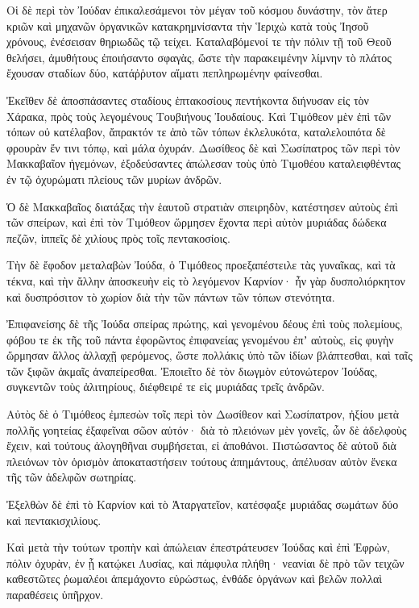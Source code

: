 {Οἱ δὲ περὶ τὸν Ἰούδαν ἐπικαλεσάμενοι τὸν μέγαν τοῦ κόσμου δυνάστην, τὸν ἄτερ κριῶν καὶ μηχανῶν ὀργανικῶν κατακρημνίσαντα τὴν Ἱεριχὼ κατὰ τοὺς Ἰησοῦ χρόνους, ἐνέσεισαν θηριωδῶς τῷ τείχει.
Καταλαβόμενοί τε τὴν πόλιν τῇ τοῦ Θεοῦ θελήσει, ἀμυθήτους ἐποιήσαντο σφαγὰς, ὥστε τὴν παρακειμένην λίμνην τὸ πλάτος ἔχουσαν σταδίων δύο, κατάῤῥυτον αἵματι πεπληρωμένην φαίνεσθαι.
\par }{\PP {}Ἐκεῖθεν δὲ ἀποσπάσαντες σταδίους ἑπτακοσίους πεντήκοντα διήνυσαν εἰς τὸν Χάρακα, πρὸς τοὺς λεγομένους Τουβιήνους Ἰουδαίους.
Καὶ Τιμόθεον μὲν ἐπὶ τῶν τόπων οὐ κατέλαβον, ἄπρακτόν τε ἀπὸ τῶν τόπων ἐκλελυκότα, καταλελοιπότα δὲ φρουρὰν ἔν τινι τόπῳ, καὶ μάλα ὀχυράν.
Δωσίθεος δὲ καὶ Σωσίπατρος τῶν περὶ τὸν Μακκαβαῖον ἡγεμόνων, ἐξοδεύσαντες ἀπώλεσαν τοὺς ὑπὸ Τιμοθέου καταλειφθέντας ἐν τῷ ὀχυρώματι πλείους τῶν μυρίων ἀνδρῶν.
\par }{\PP {}Ὁ δὲ Μακκαβαῖος διατάξας τὴν ἑαυτοῦ στρατιὰν σπειρηδὸν, κατέστησεν αὐτοὺς ἐπὶ τῶν σπείρων, καὶ ἐπὶ τὸν Τιμόθεον ὥρμησεν ἔχοντα περὶ αὐτὸν μυριάδας δώδεκα πεζῶν, ἱππεῖς δὲ χιλίους πρὸς τοῖς πεντακοσίοις.
\par }{\PP {}Τὴν δὲ ἔφοδον μεταλαβὼν Ἰούδα, ὁ Τιμόθεος προεξαπέστειλε τὰς γυναῖκας, καὶ τὰ τέκνα, καὶ τὴν ἄλλην ἀποσκευὴν εἰς τὸ λεγόμενον Καρνίον· ἦν γὰρ δυσπολιόρκητον καὶ δυσπρόσιτον τὸ χωρίον διὰ τὴν τῶν πάντων τῶν τόπων στενότητα.
\par }{\PP {}Ἐπιφανείσης δὲ τῆς Ἰούδα σπείρας πρώτης, καὶ γενομένου δέους ἐπὶ τοὺς πολεμίους, φόβου τε ἐκ τῆς τοῦ πάντα ἐφορῶντος ἐπιφανείας γενομένου ἐπʼ αὐτοὺς, εἰς φυγὴν ὥρμησαν ἄλλος ἀλλαχῇ φερόμενος, ὥστε πολλάκις ὑπὸ τῶν ἰδίων βλάπτεσθαι, καὶ ταῖς τῶν ξιφῶν ἀκμαῖς ἀναπείρεσθαι.
Ἐποιεῖτο δὲ τὸν διωγμὸν εὐτονώτερον Ἰούδας, συγκεντῶν τοὺς ἀλιτηρίους, διέφθειρέ τε εἰς μυριάδας τρεῖς ἀνδρῶν.
\par }{\PP {}Αὐτὸς δὲ ὁ Τιμόθεος ἐμπεσὼν τοῖς περὶ τὸν Δωσίθεον καὶ Σωσίπατρον, ἠξίου μετὰ πολλῆς γοητείας ἐξαφεῖναι σῶον αὐτόν· διὰ τὸ πλειόνων μὲν γονεῖς, ὧν δὲ ἀδελφοὺς ἔχειν, καὶ τούτους ἀλογηθῆναι συμβήσεται, εἰ ἀποθάνοι.
Πιστώσαντος δὲ αὐτοῦ διὰ πλειόνων τὸν ὁρισμὸν ἀποκαταστήσειν τούτους ἀπημάντους, ἀπέλυσαν αὐτὸν ἕνεκα τῆς τῶν ἀδελφῶν σωτηρίας.
\par }{\PP {}Ἐξελθὼν δὲ ἐπὶ τὸ Καρνίον καὶ τὸ Ἀταργατεῖον, κατέσφαξε μυριάδας σωμάτων δύο καὶ πεντακισχιλίους.
\par }{\PP {}Καὶ μετὰ τὴν τούτων τροπὴν καὶ ἀπώλειαν ἐπεστράτευσεν Ἰούδας καὶ ἐπὶ Ἐφρὼν, πόλιν ὀχυρὰν, ἐν ᾗ κατῴκει Λυσίας, καὶ πάμφυλα πλήθη· νεανίαι δὲ πρὸ τῶν τειχῶν καθεστῶτες ῥωμαλέοι ἀπεμάχοντο εὐρώστως, ἐνθάδε ὀργάνων καὶ βελῶν πολλαὶ παραθέσεις ὑπῆρχον.
}

